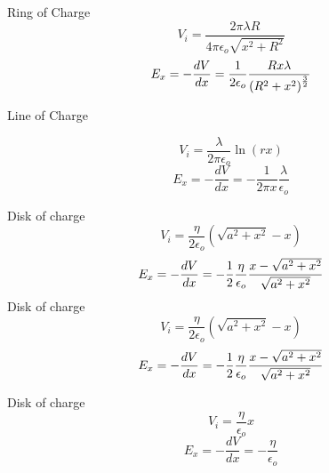 \documentclass{article}
\begin{document}
Ring of Charge%
\[
V_{i}=\frac{2\pi \lambda R}{4\pi \epsilon _{o}\sqrt{x^{2}+R^{2}}}
\]%
\[
E_{x}=-\frac{dV}{dx}=\allowbreak \frac{1}{2\epsilon _{o}}\frac{Rx\lambda }{%
\left( R^{2}+x^{2}\right) ^{\frac{3}{2}}}
\]

Line of Charge

\[
V_{i}=\frac{\lambda }{2\pi \epsilon _{o}}\ln \left( rx\right) 
\]%
\[
E_{x}=-\frac{dV}{dx}=-\frac{1}{2\pi x}\frac{\lambda }{\epsilon _{o}}
\]

Disk of charge%
\[
V_{i}=\frac{\eta }{2\epsilon _{o}}\left( \sqrt{a^{2}+x^{2}}-x\right) 
\]%
\[
E_{x}=-\frac{dV}{dx}=-\frac{1}{2}\frac{\eta }{\epsilon _{o}}\frac{x-\sqrt{%
a^{2}+x^{2}}}{\sqrt{a^{2}+x^{2}}}
\]%
Disk of charge%
\[
V_{i}=\frac{\eta }{2\epsilon _{o}}\left( \sqrt{a^{2}+x^{2}}-x\right) 
\]%
\[
E_{x}=-\frac{dV}{dx}=-\frac{1}{2}\frac{\eta }{\epsilon _{o}}\frac{x-\sqrt{%
a^{2}+x^{2}}}{\sqrt{a^{2}+x^{2}}}
\]

Disk of charge%
\[
V_{i}=\frac{\eta }{\epsilon _{o}}x
\]%
\[
E_{x}=-\frac{dV}{dx}=-\frac{\eta }{\epsilon _{o}}
\]
\end{document}
